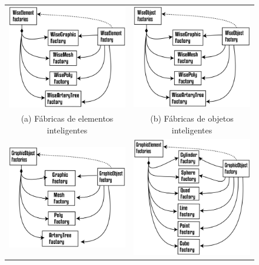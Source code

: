 \begin{figure}
	\begin{tabular}{cc}
		\includegraphics[width=0.5\linewidth]{Figures/WiseElementFactories@16x.png} &   \includegraphics[width=0.5\linewidth]{Figures/WiseObjectFactories@16x.png} \\
		(a) Fábricas de elementos inteligentes & (b) Fábricas de objetos inteligentes \\[6pt]
		\includegraphics[width=0.5\linewidth]{Figures/GraphicObjectFactories@16x.png} &   \includegraphics[width=0.5\linewidth]{Figures/GraphicElementFactories@16x.png} \\

\end{tabular}
\end{figure}

